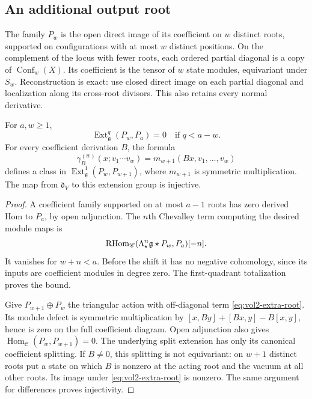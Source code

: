 \subsection{An additional output root}

The family $P_w$ is the open direct image of its coefficient
on $w$ distinct roots, supported on configurations with at most
$w$ distinct positions. On the complement of the locus with
fewer roots, each ordered partial diagonal is a copy of
$\operatorname{Conf}_w(X)$. Its coefficient is the tensor of
$w$ state modules, equivariant under $S_w$. Reconstruction is
exact: use closed direct image on each partial diagonal and
localization along its cross-root divisors. This also retains
every normal derivative.

\begin{lemma}\label{lem:vol2-root-support-bound}
For $a,w\geq1$,
\[
 \operatorname{Ext}^q_{\mathfrak g}(P_w,P_a)=0
                       \quad\text{if }q<a-w.
\]
For every coefficient derivation $B$, the formula
\begin{equation}\label{eq:vol2-extra-root}
 \gamma_B^{(w)}(x;v_1\cdots v_w)
        =m_{w+1}(Bx,v_1,\ldots,v_w)
\end{equation}
defines a class in $\operatorname{Ext}^1_{\mathfrak g}(P_w,P_{w+1})$,
where $m_{w+1}$ is symmetric multiplication. The map from
$\mathfrak d_V$ to this extension group is injective.
\end{lemma}

\begin{proof}
A coefficient family supported on at most $a-1$ roots has zero
derived Hom to $P_a$, by open adjunction. The $n$th Chevalley
term computing the desired module maps is
\[
 \operatorname{RHom}_{\mathscr C}(\Lambda^n_\star\mathfrak g\star P_w,P_a)[-n].
\]
It vanishes for $w+n<a$. Before the shift it has no negative
cohomology, since its inputs are coefficient modules in degree
zero. The first-quadrant totalization proves the bound.

Give $P_{w+1}\oplus P_w$ the triangular action with
off-diagonal term \eqref{eq:vol2-extra-root}. Its module defect
is symmetric multiplication by
$[x,By]+[Bx,y]-B[x,y]$, hence is zero on the full coefficient
diagram. Open adjunction also gives
$\operatorname{Hom}_{\mathscr C}(P_w,P_{w+1})=0$.
The underlying split extension has only its canonical
coefficient splitting. If $B\ne0$, this splitting is not
equivariant: on $w+1$ distinct roots put a state on which $B$
is nonzero at the acting root and the vacuum at all other
roots. Its image under \eqref{eq:vol2-extra-root} is nonzero.
The same argument for differences proves injectivity.
\end{proof}

